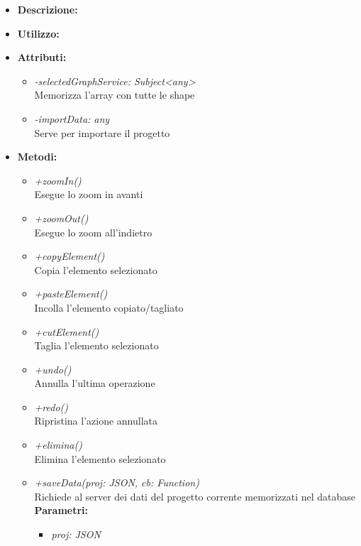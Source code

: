 \begin{itemize}
	\item \textbf{Descrizione:}\\
	
	\item \textbf{Utilizzo:}\\
	
	\item \textbf{Attributi:}
		\begin{itemize}
			\item \emph{-selectedGraphService: Subject<any>}\\
			Memorizza l'array con tutte le shape
			\item \emph{-importData: any}\\
			Serve per importare il progetto
		\end{itemize}
	\item \textbf{Metodi:}
		\begin{itemize}
			\item \emph{+zoomIn()}\\
    		Esegue lo zoom in avanti
    		\item \emph{+zoomOut()}\\
    		Esegue lo zoom all'indietro
    		\item \emph{+copyElement()}\\
    		Copia l'elemento selezionato
    		\item \emph{+pasteElement()}\\
    		Incolla l'elemento copiato/tagliato
    		\item \emph{+cutElement()}\\
    		Taglia l'elemento selezionato
    		\item \emph{+undo()}\\
    		Annulla l'ultima operazione
    		\item \emph{+redo()}\\
    		Ripristina l'azione annullata
    		\item \emph{+elimina()}\\
    		Elimina l'elemento selezionato
    		\item \emph{+saveData(proj: JSON, cb: Function)}\\
    		Richiede al server dei dati del progetto corrente memorizzati nel database\\
    		\textbf{Parametri:}
    		\begin{itemize}
    			\item \emph{proj: JSON}\\

\end{itemize}
\end{itemize}
\end{itemize}
